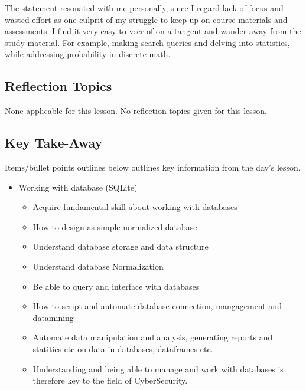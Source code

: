 {The statement resonated with me personally, since I regard lack of focus and wasted effort as one culprit of my struggle to keep up on course materials and assessments. I find it very easy to veer of on a tangent and wander away from the study material. For example, making search queries and delving into statistics, while addressing probability in discrete math.




\subsection{Reflection Topics}

None applicable for this lesson. No reflection topics given for this lesson.




\subsection{Key Take-Away}

Items/bullet points outlines  below outlines key information from the day's lesson.

\begin{itemize}
    \item Working with database (SQLite)
        \begin{itemize}
            \item Acquire fundamental skill about working with databases
            \item How to design as simple normalized database
            \item Understand database storage and data structure
            \item Understand database Normalization
            \item Be able to query and interface with databases
            \item How to script and automate database connection, mangagement and datamining
            \item Automate data manipulation and analysis, generating reports and statitics etc on data in databases, dataframes etc.
            \item Understanding and being able to manage and  work with databases is therefore key to the field of CyberSecurity.
        \end{itemize}
\end{itemize}

}
